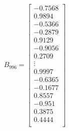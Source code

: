 \usepackage{amsmath}
\[
B_{996}=\begin{bmatrix}
-0.7568 \\
0.9894 \\
-0.5366 \\
-0.2879 \\
0.9129 \\
-0.9056 \\
0.2709 \\
\vdots \\
0.9997 \\
-0.6365 \\
-0.1677 \\
0.8557 \\
-0.951 \\
0.3875 \\
0.4444 \\
\end{bmatrix}
\]